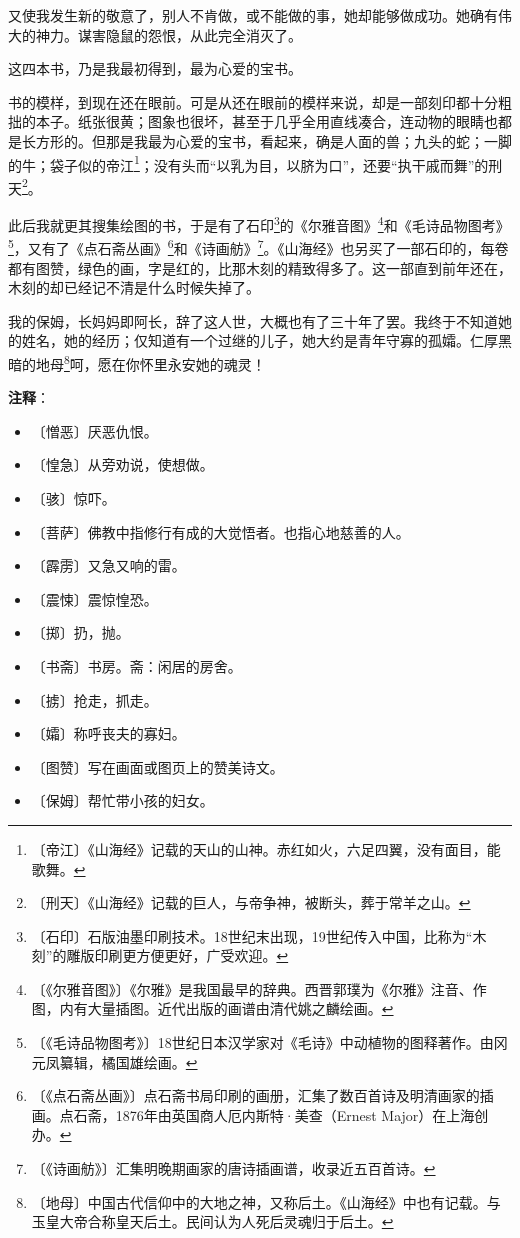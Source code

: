\documentclass[12pt,UTF-8,openany]{ctexbook}
\begin{document}
\begin{normalsize}
    又使我发生新的敬意了，别人不肯做，或不能做的事，她却能够做成功。她确有伟大的神力。谋害隐鼠的怨恨，从此完全消灭了。
    
    这四本书，乃是我最初得到，最为心爱的宝书。
    
    书的模样，到现在还在眼前。可是从还在眼前的模样来说，却是一部刻印都十分粗拙的本子。纸张很黄；图象也很坏，甚至于几乎全用直线凑合，连动物的眼睛也都是长方形的。但那是我最为心爱的宝书，看起来，确是人面的兽；九头的蛇；一脚的牛；袋子似的帝江\footnote{〔帝江〕《山海经》记载的天山的山神。赤红如火，六足四翼，没有面目，能歌舞。}；没有头而“以乳为目，以脐为口”，还要“执干戚而舞”的刑天\footnote{〔刑天〕《山海经》记载的巨人，与帝争神，被断头，葬于常羊之山。}。
    
    此后我就更其搜集绘图的书，于是有了石印\footnote{〔石印〕石版油墨印刷技术。18世纪末出现，19世纪传入中国，比称为“木刻”的雕版印刷更方便更好，广受欢迎。}的《尔雅音图》\footnote{〔《尔雅音图》〕《尔雅》是我国最早的辞典。西晋郭璞为《尔雅》注音、作图，内有大量插图。近代出版的画谱由清代姚之麟绘画。}和《毛诗品物图考》\footnote{〔《毛诗品物图考》〕18世纪日本汉学家对《毛诗》中动植物的图释著作。由冈元凤纂辑，橘国雄绘画。}，又有了《点石斋丛画》\footnote{〔《点石斋丛画》〕点石斋书局印刷的画册，汇集了数百首诗及明清画家的插画。点石斋，1876年由英国商人厄内斯特·美查（Ernest Major）在上海创办。}和《诗画舫》\footnote{〔《诗画舫》〕汇集明晚期画家的唐诗插画谱，收录近五百首诗。}。《山海经》也另买了一部石印的，每卷都有图赞，绿色的画，字是红的，比那木刻的精致得多了。这一部直到前年还在，木刻的却已经记不清是什么时候失掉了。
    
    我的保姆，长妈妈即阿长，辞了这人世，大概也有了三十年了罢。我终于不知道她的姓名，她的经历；仅知道有一个过继的儿子，她大约是青年守寡的孤孀。仁厚黑暗的地母\footnote{〔地母〕中国古代信仰中的大地之神，又称后土。《山海经》中也有记载。与玉皇大帝合称皇天后土。民间认为人死后灵魂归于后土。}呵，愿在你怀里永安她的魂灵！
    
\end{normalsize}


\newpage

\textbf{注释}：

\vspace{-1em}

\begin{itemize}
    \setlength\itemsep{-0.2em}
    \item 〔憎恶〕厌恶仇恨。
    \item 〔惶急〕从旁劝说，使想做。
    \item 〔骇〕惊吓。
    \item 〔菩萨〕佛教中指修行有成的大觉悟者。也指心地慈善的人。
    \item 〔霹雳〕又急又响的雷。
    \item 〔震悚〕震惊惶恐。
    \item 〔掷〕扔，抛。
    \item 〔书斋〕书房。斋：闲居的房舍。
    \item 〔掳〕抢走，抓走。
    \item 〔孀〕称呼丧夫的寡妇。
    \item 〔图赞〕写在画面或图页上的赞美诗文。
    \item 〔保姆〕帮忙带小孩的妇女。
\end{itemize}
\end{document}
